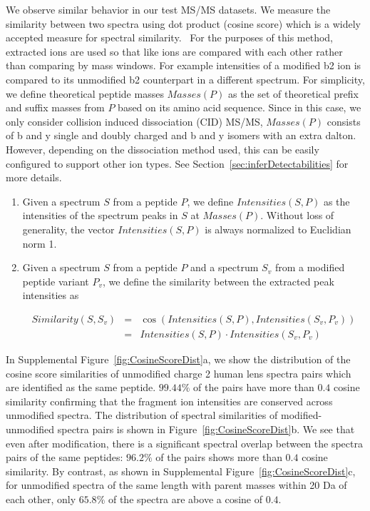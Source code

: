 \documentclass[11pt]{article}
\begin{document}
{We observe similar behavior in our test MS/MS datasets. We measure the similarity between two spectra
using dot product (cosine score) which is a widely accepted measure for
spectral similarity.~\cite{lam07,Stein1994} For the purposes of this method, extracted ions are used so that like ions are compared with each other rather than comparing by mass windows. For example intensities of a modified b2 ion is compared to its unmodified b2 counterpart in a different spectrum. For simplicity, we define theoretical peptide masses $Masses(P)$ as the set of theoretical prefix and suffix masses from $P$ based on its amino acid sequence. Since in this case, we only consider collision induced dissociation (CID) MS/MS, $Masses(P)$ consists of b and y single and doubly charged and b and y isomers with an extra dalton. However, depending on the dissociation method used, this can be easily configured to support other ion types. See Section~\ref{sec:inferDetectabilities} for more details. 

\begin{enumerate}
\item Given a spectrum $S$ from a peptide $P$, we define $Intensities(S,P)$ as the intensities of the spectrum peaks in $S$ at $Masses(P)$. Without loss of generality, the vector $Intensities(S,P)$ is always normalized to Euclidian norm 1.
\item Given a spectrum $S$ from a peptide $P$ and a spectrum $S_v$ from a modified peptide variant $P_v$, we define the similarity between the extracted peak intensities as

    \begin{eqnarray*}
    Similarity(S,S_v) & = & \cos(Intensities(S,P),Intensities(S_v,P_v)) \\
                      & = & Intensities(S,P) \cdot Intensities(S_v,P_v)
    \end{eqnarray*}
\end{enumerate}

In Supplemental Figure~\ref{fig:CosineScoreDist}a, we show the distribution of the cosine score similarities of unmodified charge 2 human lens spectra pairs which are identified as the same peptide. $99.44\%$ of the pairs have more than $0.4$ cosine similarity confirming that the fragment ion intensities are conserved across unmodified spectra. The distribution of spectral similarities of modified-unmodified spectra pairs is shown in Figure~\ref{fig:CosineScoreDist}b. We see that even after modification, there is a significant spectral overlap between the spectra pairs of the same peptides: $96.2\%$ of the pairs shows more than $0.4$ cosine similarity. By contrast, as shown in Supplemental Figure~\ref{fig:CosineScoreDist}c, for unmodified spectra of the same length with parent masses within 20 Da of each other, only $65.8\%$ of the spectra are above a cosine of $0.4$.

}
\end{document}
